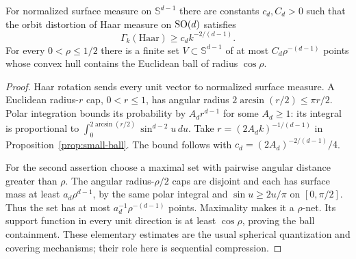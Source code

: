 \begin{lemma}\label{lem:sphere}
For normalized surface measure on $\mathbb S^{d-1}$ there are constants
$c_d,C_d>0$ such that the orbit distortion of Haar measure on $\operatorname{SO}(d)$
satisfies
\[
             \Gamma_k(\mathrm{Haar})\ge c_d k^{-2/(d-1)}.
\]
For every $0<\rho\le1/2$ there is a finite set $V\subset\mathbb S^{d-1}$
of at most $C_d\rho^{-(d-1)}$ points whose convex hull contains the
Euclidean ball of radius $\cos\rho$.
\end{lemma}
\begin{proof}
Haar rotation sends every unit vector to normalized surface measure.
A Euclidean radius-$r$ cap, $0<r\le1$, has angular radius
$2\arcsin(r/2)\le\pi r/2$. Polar integration bounds its probability
by $A_dr^{d-1}$ for some $A_d\ge1$: its integral is proportional to
$\int_0^{2\arcsin(r/2)}\sin^{d-2}u\,du$.
Take $r=(2A_dk)^{-1/(d-1)}$ in Proposition~\ref{prop:small-ball}.
The bound follows with $c_d=(2A_d)^{-2/(d-1)}/4$.

For the second assertion choose a maximal set with pairwise angular
distance greater than $\rho$. The angular radius-$\rho/2$ caps are
disjoint and each has surface mass at least $a_d\rho^{d-1}$, by the
same polar integral and $\sin u\ge2u/\pi$ on $[0,\pi/2]$.
Thus the set has at most $a_d^{-1}\rho^{-(d-1)}$ points.
Maximality makes it a $\rho$-net. Its support function in every unit
direction is at least $\cos\rho$, proving the ball containment.
These elementary estimates are the usual spherical quantization and
covering mechanisms; their role here is sequential compression.
\end{proof}

